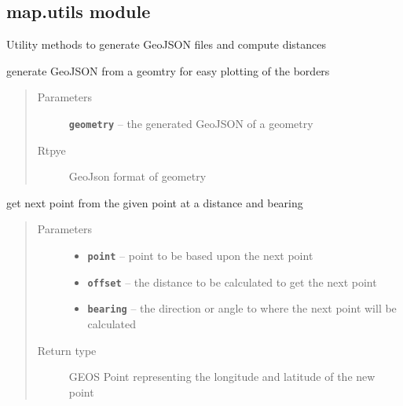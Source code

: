 \documentclass[letterpaper,10pt,english]{sphinxmanual}
\begin{document}
\subsection{map.utils module}
\label{api/map:module-map.utils}\label{api/map:map-utils-module}
Utility methods to generate GeoJSON files and compute distances

\begin{fulllineitems}
\label{api/map:map.utils.generateGeoJson}
generate GeoJSON from a geomtry for easy plotting of the borders
\begin{quote}\begin{description}
\item[{Parameters}] \leavevmode
\textbf{\texttt{geometry}} -- the generated GeoJSON of a geometry

\item[{Rtpye}] \leavevmode
GeoJson format of geometry

\end{description}\end{quote}

\end{fulllineitems}


\begin{fulllineitems}
\label{api/map:map.utils.getNextPoint}
get next point from the given point at a distance and bearing
\begin{quote}\begin{description}
\item[{Parameters}] \leavevmode\begin{itemize}
\item {} 
\textbf{\texttt{point}} -- point to be based upon the next point

\item {} 
\textbf{\texttt{offset}} -- the distance to be calculated to get the next point

\item {} 
\textbf{\texttt{bearing}} -- the direction or angle to where the next point will be calculated

\end{itemize}

\item[{Return type}] \leavevmode
GEOS Point representing the longitude and latitude of the new point

\end{description}\end{quote}

\end{fulllineitems}
\end{document}
